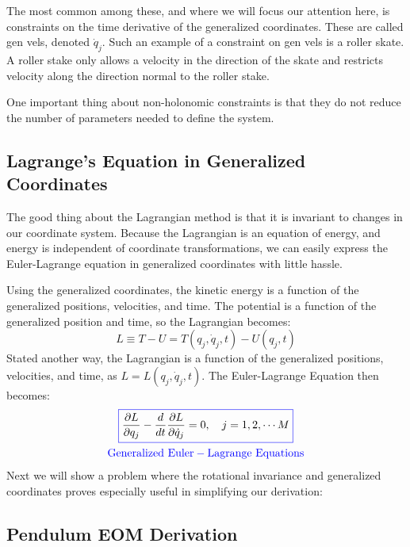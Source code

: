 \documentclass[12pt]{report}
\begin{document}
The most common among these, and where we will focus our attention here, is constraints on the time derivative of the generalized coordinates. These are called \glspl{gen vel}, denoted $\dot{q}_j$. Such an example of a constraint on \glspl{gen vel} is a roller skate. A roller stake only allows a velocity in the direction of the skate and restricts velocity along the direction normal to the roller stake.

One important thing about non-holonomic constraints is that they do not reduce the number of parameters needed to define the system. 

\subsection{Lagrange's Equation in Generalized Coordinates}

The good thing about the \gls{Lagrangian} method is that it is invariant to changes in our coordinate system. Because the \gls{Lagrangian} is an equation of energy, and energy is independent of coordinate transformations, we can easily express the Euler-Lagrange equation in generalized coordinates with little hassle.

Using the generalized coordinates, the kinetic energy is a function of the generalized positions, velocities, and time. The potential is a function of the generalized position and time, so the \gls{Lagrangian} becomes:
$$L\equiv T-U=T(q_j,\dot{q}_j,t)-U(q_j,t)$$
Stated another way, the \gls{Lagrangian} is a function of the generalized positions, velocities, and time, as $L=L(q_j,\dot{q}_j,t)$. The Euler-Lagrange Equation then becomes:
\begin{gather}\label{eq:Euler-Lagrange General}
\color{blue}\boxed{\color{black}\frac{\partial L}{\partial q_j}-\frac{d}{dt}\frac{\partial L}{\partial \dot{q}_j}=0,\ \ \ j=1,2,\cdots M}\\
\mathrm{\color{blue}Generalized \ Euler-Lagrange \ Equations}
\end{gather}
Next we will show a problem where the rotational invariance and generalized coordinates proves especially useful in simplifying our derivation:
\subsection{Pendulum EOM Derivation}
\end{document}
